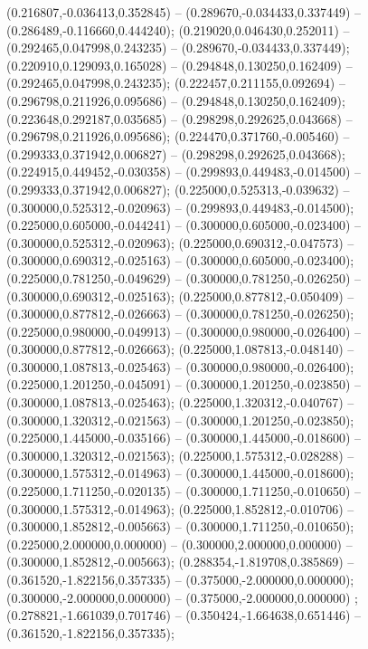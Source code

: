  (0.216807,-0.036413,0.352845) -- (0.289670,-0.034433,0.337449) -- (0.286489,-0.116660,0.444240);
 (0.219020,0.046430,0.252011) -- (0.292465,0.047998,0.243235) -- (0.289670,-0.034433,0.337449);
 (0.220910,0.129093,0.165028) -- (0.294848,0.130250,0.162409) -- (0.292465,0.047998,0.243235);
 (0.222457,0.211155,0.092694) -- (0.296798,0.211926,0.095686) -- (0.294848,0.130250,0.162409);
 (0.223648,0.292187,0.035685) -- (0.298298,0.292625,0.043668) -- (0.296798,0.211926,0.095686);
 (0.224470,0.371760,-0.005460) -- (0.299333,0.371942,0.006827) -- (0.298298,0.292625,0.043668);
 (0.224915,0.449452,-0.030358) -- (0.299893,0.449483,-0.014500) -- (0.299333,0.371942,0.006827);
 (0.225000,0.525313,-0.039632) -- (0.300000,0.525312,-0.020963) -- (0.299893,0.449483,-0.014500);
 (0.225000,0.605000,-0.044241) -- (0.300000,0.605000,-0.023400) -- (0.300000,0.525312,-0.020963);
 (0.225000,0.690312,-0.047573) -- (0.300000,0.690312,-0.025163) -- (0.300000,0.605000,-0.023400);
 (0.225000,0.781250,-0.049629) -- (0.300000,0.781250,-0.026250) -- (0.300000,0.690312,-0.025163);
 (0.225000,0.877812,-0.050409) -- (0.300000,0.877812,-0.026663) -- (0.300000,0.781250,-0.026250);
 (0.225000,0.980000,-0.049913) -- (0.300000,0.980000,-0.026400) -- (0.300000,0.877812,-0.026663);
 (0.225000,1.087813,-0.048140) -- (0.300000,1.087813,-0.025463) -- (0.300000,0.980000,-0.026400);
 (0.225000,1.201250,-0.045091) -- (0.300000,1.201250,-0.023850) -- (0.300000,1.087813,-0.025463);
 (0.225000,1.320312,-0.040767) -- (0.300000,1.320312,-0.021563) -- (0.300000,1.201250,-0.023850);
 (0.225000,1.445000,-0.035166) -- (0.300000,1.445000,-0.018600) -- (0.300000,1.320312,-0.021563);
 (0.225000,1.575312,-0.028288) -- (0.300000,1.575312,-0.014963) -- (0.300000,1.445000,-0.018600);
 (0.225000,1.711250,-0.020135) -- (0.300000,1.711250,-0.010650) -- (0.300000,1.575312,-0.014963);
 (0.225000,1.852812,-0.010706) -- (0.300000,1.852812,-0.005663) -- (0.300000,1.711250,-0.010650);
 (0.225000,2.000000,0.000000) -- (0.300000,2.000000,0.000000) -- (0.300000,1.852812,-0.005663);
 (0.288354,-1.819708,0.385869) -- (0.361520,-1.822156,0.357335) -- (0.375000,-2.000000,0.000000);
 (0.300000,-2.000000,0.000000) -- (0.375000,-2.000000,0.000000) ;
 (0.278821,-1.661039,0.701746) -- (0.350424,-1.664638,0.651446) -- (0.361520,-1.822156,0.357335);
